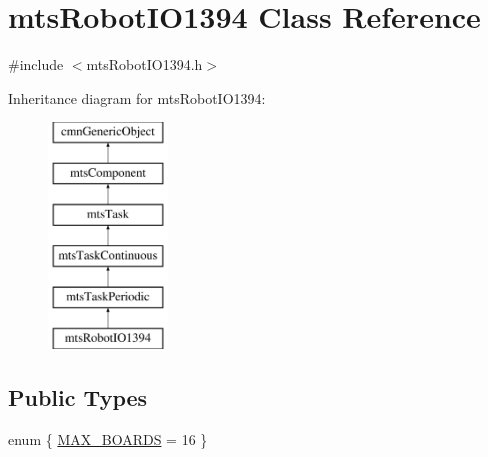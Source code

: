 \hypertarget{classmts_robot_i_o1394}{\section{mts\-Robot\-I\-O1394 Class Reference}
\label{classmts_robot_i_o1394}
}


{\ttfamily \#include $<$mts\-Robot\-I\-O1394.\-h$>$}

Inheritance diagram for mts\-Robot\-I\-O1394\-:\begin{figure}[H]
\begin{center}
\leavevmode
\includegraphics[height=6.000000cm]{d3/d42/classmts_robot_i_o1394}
\end{center}
\end{figure}
\subsection*{Public Types}
\begin{DoxyCompactItemize}
\item 
enum \{ \hyperlink{classmts_robot_i_o1394_ae3cdf18b9edb76d639a8894b1121626eae14ba9547603419cc36292983705a60d}{M\-A\-X\-\_\-\-B\-O\-A\-R\-D\-S} = 16
 \}
\end{DoxyCompactItemize}
